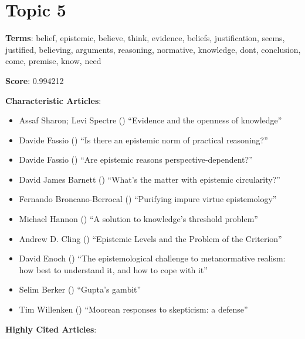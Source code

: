 \documentclass[
  10pt,
  letterpaper,
  DIV=11,
  numbers=noendperiod,
  twoside]{scrartcl}
\providecommand{\tightlist}{%
  \setlength{\itemsep}{0pt}\setlength{\parskip}{0pt}}\usepackage{longtable,booktabs,array}
\begin{document}
\section{Topic 5}\label{topic-5}

\textbf{Terms}: belief, epistemic, believe, think, evidence, beliefs,
justification, seems, justified, believing, arguments, reasoning,
normative, knowledge, dont, conclusion, come, premise, know, need

\textbf{Score}: 0.994212

\textbf{Characteristic Articles}:

\begin{itemize}
\tightlist
\item
  Assaf Sharon; Levi Spectre ()
  ``Evidence and the openness of knowledge''
\item
  Davide Fassio () ``Is there an
  epistemic norm of practical reasoning?''
\item
  Davide Fassio
  ()
  ``Are epistemic reasons perspective-dependent?''
\item
  David James Barnett () ``What's
  the matter with epistemic circularity?''
\item
  Fernando Broncano-Berrocal ()
  ``Purifying impure virtue epistemology''
\item
  Michael Hannon () ``A solution
  to knowledge's threshold problem''
\item
  Andrew D. Cling () ``Epistemic
  Levels and the Problem of the Criterion''
\item
  David Enoch () ``The
  epistemological challenge to metanormative realism: how best to
  understand it, and how to cope with it''
\item
  Selim Berker () ``Gupta's
  gambit''
\item
  Tim Willenken () ``Moorean
  responses to skepticism: a defense''
\end{itemize}

\textbf{Highly Cited Articles}:
\end{document}
